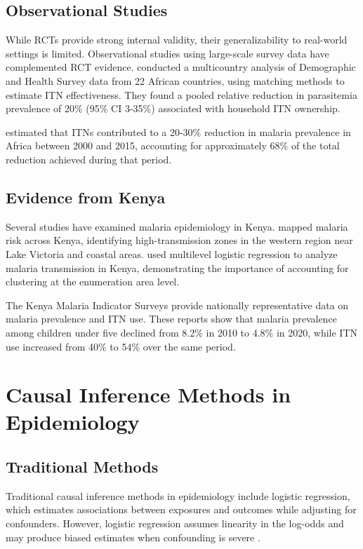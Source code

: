 \subsection{Observational Studies}

While RCTs provide strong internal validity, their generalizability to real-world settings is limited. Observational studies using large-scale survey data have complemented RCT evidence. \citet{lim2011net} conducted a multicountry analysis of Demographic and Health Survey data from 22 African countries, using matching methods to estimate ITN effectiveness. They found a pooled relative reduction in parasitemia prevalence of 20\% (95\% CI 3-35\%) associated with household ITN ownership.

\citet{bhatt2015effect} estimated that ITNs contributed to a 20-30\% reduction in malaria prevalence in Africa between 2000 and 2015, accounting for approximately 68\% of the total reduction achieved during that period.

\subsection{Evidence from Kenya}

Several studies have examined malaria epidemiology in Kenya. \citet{noor2014risk} mapped malaria risk across Kenya, identifying high-transmission zones in the western region near Lake Victoria and coastal areas. \citet{ayele2024assessment} used multilevel logistic regression to analyze malaria transmission in Kenya, demonstrating the importance of accounting for clustering at the enumeration area level.

The Kenya Malaria Indicator Surveys \citep{kmis2015report, kmis2020report} provide nationally representative data on malaria prevalence and ITN use. These reports show that malaria prevalence among children under five declined from 8.2\% in 2010 to 4.8\% in 2020, while ITN use increased from 40\% to 54\% over the same period.

\section{Causal Inference Methods in Epidemiology}

\subsection{Traditional Methods}

Traditional causal inference methods in epidemiology include logistic regression, which estimates associations between exposures and outcomes while adjusting for confounders. However, logistic regression assumes linearity in the log-odds and may produce biased estimates when confounding is severe \citep{austin2011introduction}.

